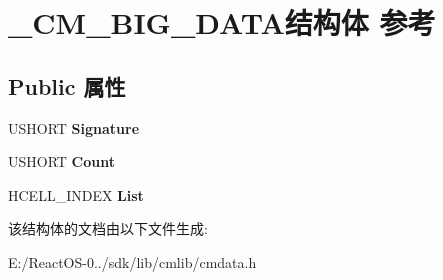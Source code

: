 \hypertarget{struct___c_m___b_i_g___d_a_t_a}{}\section{\+\_\+\+C\+M\+\_\+\+B\+I\+G\+\_\+\+D\+A\+T\+A结构体 参考}
\label{struct___c_m___b_i_g___d_a_t_a}
\subsection*{Public 属性}
\begin{DoxyCompactItemize}
\item 
\mbox{\label{struct___c_m___b_i_g___d_a_t_a_ae7650eac6ba4c12e16de044cf870ce80}} 
U\+S\+H\+O\+RT {\bfseries Signature}
\item 
\mbox{\label{struct___c_m___b_i_g___d_a_t_a_a98b916dec866d1508965758ed7e55ffb}} 
U\+S\+H\+O\+RT {\bfseries Count}
\item 
\mbox{\label{struct___c_m___b_i_g___d_a_t_a_a3e7b6758b48c0f8edf2bf9f1d445c26e}} 
H\+C\+E\+L\+L\+\_\+\+I\+N\+D\+EX {\bfseries List}
\end{DoxyCompactItemize}


该结构体的文档由以下文件生成\+:\begin{DoxyCompactItemize}
\item 
E\+:/\+React\+O\+S-\/0../sdk/lib/cmlib/cmdata.\+h\end{DoxyCompactItemize}

